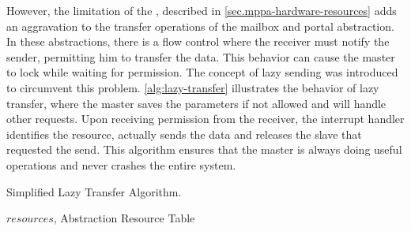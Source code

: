 			However, the limitation of the \dma, described in
			\autoref{sec.mppa-hardware-resources} adds an aggravation to the
			transfer operations of the mailbox and portal abstraction.
			In these abstractions, there is a flow control where the receiver
			must notify the sender, permitting him to transfer the data. This
			behavior can cause the master to lock while waiting for permission.
			The concept of lazy sending was introduced to circumvent this
			problem. \autoref{alg:lazy-transfer} illustrates the behavior of
			lazy transfer, where the master saves the parameters if not
			allowed and will handle other requests. Upon receiving permission
			from the receiver, the interrupt handler identifies the resource,
			actually sends the data and releases the slave that requested the
			send. This algorithm ensures that the master is always doing useful
			operations and never crashes the entire system.

			\begin{algorithm}[!tb]
				\caption{Simplified Lazy Transfer Algorithm.}%
				\label{alg:lazy-transfer}%
				\begin{algorithmic}[1]
				\Require $resources$, Abstraction Resource Table


						\Else
						\EndIf
					\EndProcedure%


						\Else
						\EndIf
					\EndProcedure%


						                                
					\EndProcedure%

				\end{algorithmic}%

			\end{algorithm}

